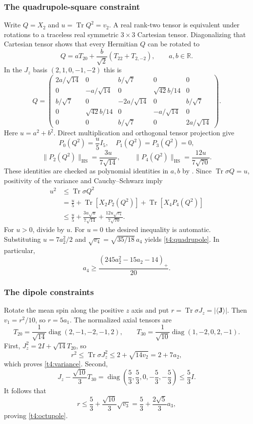 \documentclass[11pt,a4paper]{article}
\newcommand{\Tr}{\operatorname{Tr}}
\newcommand{\HS}{\mathrm{HS}}
\begin{document}
\subsubsection{The quadrupole-square constraint}
Write $Q=X_2$ and $u=\Tr Q^2=v_2$.
A real rank-two tensor is equivalent under rotations to a traceless real
symmetric $3\times3$ Cartesian tensor. Diagonalizing that Cartesian tensor
shows that every Hermitian $Q$ can be rotated to
\[
Q=aT_{20}+\frac{b}{\sqrt2}(T_{22}+T_{2,-2}),\qquad a,b\in\mathbb R.
\]
In the $J_z$ basis $(2,1,0,-1,-2)$ this is
\[
Q=\begin{pmatrix}
 2a/\sqrt{14}&0&b/\sqrt7&0&0\\
 0&-a/\sqrt{14}&0&\sqrt{42}b/14&0\\
 b/\sqrt7&0&-2a/\sqrt{14}&0&b/\sqrt7\\
 0&\sqrt{42}b/14&0&-a/\sqrt{14}&0\\
 0&0&b/\sqrt7&0&2a/\sqrt{14}
\end{pmatrix}.
\]
Here $u=a^2+b^2$.
Direct multiplication and orthogonal tensor projection give
\[
P_0(Q^2)=\frac u5I_5,\quad P_1(Q^2)=P_3(Q^2)=0,
\]
\[
\|P_2(Q^2)\|_\HS=\frac{3u}{7\sqrt{14}},\qquad
\|P_4(Q^2)\|_\HS=\frac{12u}{7\sqrt{70}}.
\]
These identities are checked as polynomial identities in $a,b$ by
.
Since $\Tr\sigma Q=u$, positivity of the variance and Cauchy--Schwarz imply
\begin{align*}
u^2&\le\Tr\sigma Q^2\\
&=\frac u5+\Tr[X_2P_2(Q^2)]+\Tr[X_4P_4(Q^2)]\\
&\le\frac u5+\frac{3u\sqrt u}{7\sqrt{14}}
              +\frac{12u\sqrt{v_4}}{7\sqrt{70}}.
\end{align*}
For $u>0$, divide by $u$. For $u=0$ the desired inequality is automatic.
Substituting $u=7a_2^2/2$ and
$\sqrt{v_4}=\sqrt{35/18}\,a_4$ yields \eqref{t4:quadrupole}.
In particular,
\[
a_4\ge\frac{(245a_2^2-15a_2-14)_+}{20}.
\]

\subsubsection{The dipole constraints}
Rotate the mean spin along the positive $z$ axis and put
$r=\Tr\sigma J_z=|\langle\mathbf J\rangle|$.
Then $v_1=r^2/10$, so $r=5a_1$.
The normalized axial tensors are
\[
T_{20}=\frac1{\sqrt{14}}\operatorname{diag}(2,-1,-2,-1,2),\qquad
T_{30}=\frac1{\sqrt{10}}\operatorname{diag}(1,-2,0,2,-1).
\]
First, $J_z^2=2I+\sqrt{14}T_{20}$, so
\[
r^2\le\Tr\sigma J_z^2\le2+\sqrt{14v_2}=2+7a_2,
\]
which proves \eqref{t4:variance}.
Second,
\[
J_z-\frac{\sqrt{10}}3T_{30}
 =\operatorname{diag}\left(\frac53,\frac53,0,-\frac53,-\frac53\right)
 \le\frac53I.
\]
It follows that
\[
r\le\frac53+\frac{\sqrt{10}}3\sqrt{v_3}
 =\frac53+\frac{2\sqrt5}3a_3,
\]
proving \eqref{t4:octupole}.
\end{document}
